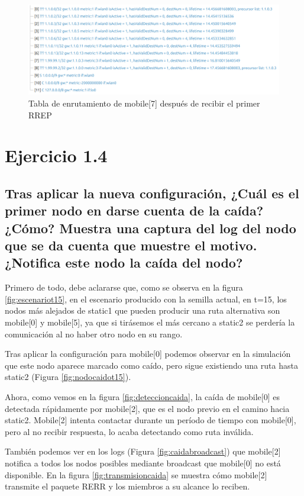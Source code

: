 \begin{figure}[H]
    \centering
    \includegraphics[width=125mm, scale=0.75]{imaxes/aodv/ejercicio3_2.png}
    \caption{Tabla de enrutamiento de mobile[7] después de recibir el primer RREP}
    \label{fig:rtable_post_mob7RREP}
\end{figure}

\vspace{1.25cm}
\section{Ejercicio 1.4}

\subsection{Tras aplicar la nueva configuración, ¿Cuál es el primer nodo en darse cuenta de la caída? ¿Cómo? Muestra una captura del log del nodo que se da cuenta que muestre el motivo. ¿Notifica este nodo la caída del nodo?}

Primero de todo, debe aclararse que, como se observa en la figura \ref{fig:escenariot15}, en el escenario producido con la semilla actual, en t=15, los nodos más alejados de static1 que pueden producir una ruta alternativa son mobile[0] y mobile[5], ya que si tirásemos el más cercano a static2 se perdería la comunicación al no haber otro nodo en su rango.

Tras aplicar la configuración para mobile[0] podemos observar en la simulación que este nodo aparece marcado como caído, pero sigue existiendo una ruta hasta static2 (Figura \ref{fig:nodocaidot15}).

Ahora, como vemos en la figura \ref{fig:deteccioncaida}, la caída de mobile[0] es detectada rápidamente por mobile[2], que es el nodo previo en el camino hacia static2. Mobile[2] intenta contactar durante un período de tiempo con mobile[0], pero al no recibir respuesta, lo acaba detectando como ruta inválida.

También podemos ver en los logs (Figura \ref{fig:caidabroadcast}) que mobile[2] notifica a todos los nodos posibles mediante broadcast que mobile[0] no está disponible. En la figura \ref{fig:transmisioncaida} se muestra cómo mobile[2] transmite el paquete RERR y los miembros a su alcance lo reciben.

